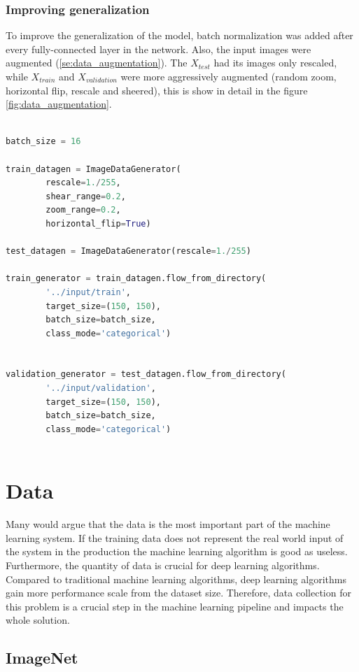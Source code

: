 \documentclass[times, utf8, diplomski]{fer}
\begin{document}
\subsection{Improving generalization}

To improve the generalization of the model, batch normalization was added after every fully-connected layer in the network. Also, the input images were augmented (\ref{se:data_augmentation}). The $X_{test}$ had its images only rescaled, while $X_{train}$ and $X_{validation}$ were more aggressively augmented (random zoom, horizontal flip, rescale and sheered), this is show in detail in the figure \ref{fig:data_augmentation}.

\begin{lstlisting}[language=Python, caption=Data augmentation of the input dataset (images)]

batch_size = 16

train_datagen = ImageDataGenerator(
        rescale=1./255,
        shear_range=0.2,
        zoom_range=0.2,
        horizontal_flip=True)

test_datagen = ImageDataGenerator(rescale=1./255)

train_generator = train_datagen.flow_from_directory(
        '../input/train',
        target_size=(150, 150),
        batch_size=batch_size,
        class_mode='categorical') 


validation_generator = test_datagen.flow_from_directory(
        '../input/validation',
        target_size=(150, 150),
        batch_size=batch_size,
        class_mode='categorical')
        
\end{lstlisting}

\chapter{Data}

Many would argue that the data is the most important part of the machine learning system. If the training data does not represent the real world input of the system in the production the machine learning algorithm is good as useless. Furthermore, the quantity of data is crucial for deep learning algorithms. Compared to traditional machine learning algorithms, deep learning algorithms gain more performance scale from the dataset size. Therefore, data collection for this problem is a crucial step in the machine learning pipeline and impacts the whole solution.

\section{ImageNet}
\end{document}
